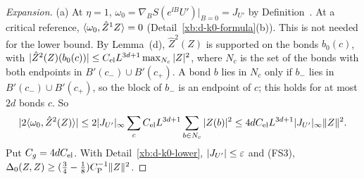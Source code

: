 \begin{proof}[Expansion]
(a) At $\eta=1$, $\omega_0=\nabla_BS(e^{\ii B}U')|_{B=0}=J_{U'}$ by Definition~. At a critical reference, $\langle \omega_0,\hat Z^1Z\rangle=0$ (Detail~\ref{xb:d-k0-formula}(b)). This is not needed for the lower bound. By Lemma~(d), $\hat Z^2(Z)$ is supported on the bonds $b_0(c)$, with $|\hat Z^2(Z)(b_0(c))|\le C_{\rm el}L^{3d+1}\max_{N_c}|Z|^2$, where $N_c$ is the set of the bonds with both endpoints in $B'(c_-)\cup B'(c_+)$. A bond $b$ lies in $N_c$ only if $b_-$ lies in $B'(c_-)\cup B'(c_+)$, so the block of $b_-$ is an endpoint of $c$; this holds for at most $2d$ bonds $c$. So
\[
|2\langle \omega_0,\hat Z^2(Z)\rangle|\le2|J_{U'}|_\infty\sum_cC_{\rm el}L^{3d+1}\sum_{b\in N_c}|Z(b)|^2\le4dC_{\rm el}L^{3d+1}|J_{U'}|_\infty\|Z\|^2 .
\]
Put $C_g=4dC_{\rm el}$. With Detail~\ref{xb:d-k0-lower}, $|J_{U'}|\le\varepsilon$ and (FS3), $\Delta_0(Z,Z)\ge(\frac34-\frac18)C_{\rm P}^{-1}\|Z\|^2$.


\end{proof}
